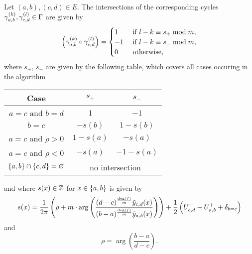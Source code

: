 \documentclass[main.tex]{subfiles}
\begin{document}
  \begin{thm}\label{thm:intsec_numb}
      Let $(a,b),(c,d) \in E$. The intersections of the corresponding cycles $\gamma_{a,b}^{(k)}, \gamma_{c,d}^{(l)} \in \Gamma$ are given by
      \begin{equation}
          \left(\gamma_{a,b}^{(k)} \circ \gamma_{c,d}^{(l)}\right)
          = \begin{cases}
              1  &\text{ if } l-k \equiv s_+ \bmod m,\\
              -1 &\text{ if } l-k \equiv s_- \bmod m,\\
              0 &\text{ otherwise,}
          \end{cases}
      \end{equation}
      where $s_+$, $s_-$ are given by the following table, which covers all
      cases occuring in the algorithm
      \begin{center}
      \begin{tabular}{ccc}
          \toprule
          Case
          & $s_+$ & $s_-$ \\
          \midrule
          $a=c$ and $b=d$
          & $1$ & $-1$ \\
          $b=c$
          & $-s(b)$ & $1-s(b)$ \\
          $a=c$ and $\rho>0$
          & $1-s(a)$ & $-s(a)$ \\
          $a=c$ and $\rho<0$
          & $-s(a)$ & $-1-s(a)$\\
          $\left\{a,b\right\}\cap\left\{c,d\right\}=\varnothing$ & \multicolumn{2}{c}{no intersection} \\
          \bottomrule
      \end{tabular}
      \end{center}
      and where $s(x)\in\mathbb{Z}$ for $x\in\left\{a,b\right\}$ is given by
      \begin{equation}
	    s(x) = \frac{1}{2\pi}\left( \rho + m \cdot \arg \left( \frac{(d-c)^{\frac{\operatorname{deg}(f)}{m}}\tilde{y}_{c,d}(x)}{(b-a)^{\frac{\operatorname{deg}(f)}{m}}\tilde{y}_{a,b}(x)} \right) \right) + \frac{1}{2}
	    \left( U_{c,d}^+ - U_{a,b}^+
	    + \delta_{b=c}\right)
      \end{equation}
     and
      \begin{equation}
          \rho = \arg \left( \frac{b-a}{d-c} \right).
      \end{equation}
 \end{thm}
\end{document}
